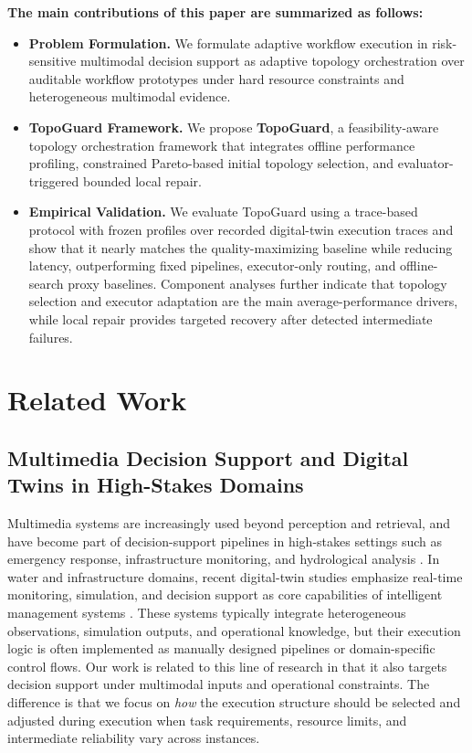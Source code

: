 \documentclass[acmsmall,review,anonymous]{acmart}
\begin{document}
\noindent\textbf{The main contributions of this paper are summarized as follows:}
\begin{itemize}
    \item \textbf{Problem Formulation.} We formulate adaptive workflow execution in risk-sensitive multimodal decision support as adaptive topology orchestration over auditable workflow prototypes under hard resource constraints and heterogeneous multimodal evidence.
    \item \textbf{TopoGuard Framework.} We propose \textbf{TopoGuard}, a feasibility-aware topology orchestration framework that integrates offline performance profiling, constrained Pareto-based initial topology selection, and evaluator-triggered bounded local repair.
    \item \textbf{Empirical Validation.} We evaluate TopoGuard using a trace-based protocol with frozen profiles over recorded digital-twin execution traces and show that it nearly matches the quality-maximizing baseline while reducing latency, outperforming fixed pipelines, executor-only routing, and offline-search proxy baselines. Component analyses further indicate that topology selection and executor adaptation are the main average-performance drivers, while local repair provides targeted recovery after detected intermediate failures.
\end{itemize}

\section{Related Work}
\label{sec:related_work}

\subsection{Multimedia Decision Support and Digital Twins in High-Stakes Domains}

Multimedia systems are increasingly used beyond perception and retrieval, and have become part of decision-support pipelines in high-stakes settings such as emergency response, infrastructure monitoring, and hydrological analysis \cite{tang2016emergency,pathak2020hydroinformatics,yu2024warenet}. In water and infrastructure domains, recent digital-twin studies emphasize real-time monitoring, simulation, and decision support as core capabilities of intelligent management systems \cite{li2024intelligentwater,ge2025urbanflooddt}. These systems typically integrate heterogeneous observations, simulation outputs, and operational knowledge, but their execution logic is often implemented as manually designed pipelines or domain-specific control flows. Our work is related to this line of research in that it also targets decision support under multimodal inputs and operational constraints. The difference is that we focus on \emph{how} the execution structure should be selected and adjusted during execution when task requirements, resource limits, and intermediate reliability vary across instances.
\end{document}
